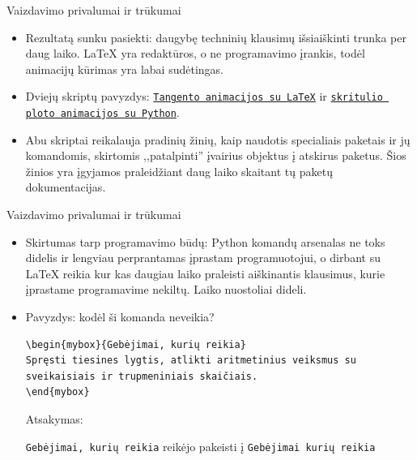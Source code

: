 \documentclass{beamer}
\begin{document}
\begin{frame}[fragile]{Vaizdavimo privalumai ir trūkumai}
\begin{itemize}
\item Rezultatą sunku pasiekti: daugybę techninių klausimų išsiaiškinti trunka per daug laiko. LaTeX yra redaktūros, o ne programavimo įrankis, todėl animacijų kūrimas yra labai sudėtingas. 

\item Dviejų skriptų pavyzdys: \href{https://pastebin.com/0qxQCsf7}{\texttt{Tangento animacijos su LaTeX}} ir \href{https://pastebin.com/YXVx8XT7}{\texttt{skritulio ploto animacijos su Python}}.

\item Abu skriptai reikalauja pradinių žinių, kaip naudotis specialiais paketais ir jų komandomis, skirtomis ,,patalpinti'' įvairius objektus į atskirus paketus. Šios žinios yra įgyjamos praleidžiant daug laiko skaitant tų paketų dokumentacijas.
\end{itemize}
\end{frame}

\begin{frame}[fragile]{Vaizdavimo privalumai ir trūkumai}
\begin{itemize}
\item Skirtumas tarp programavimo būdų: Python komandų arsenalas ne toks didelis ir lengviau perprantamas įprastam programuotojui, o dirbant su LaTeX reikia kur kas daugiau laiko praleisti aiškinantis klausimus, kurie įprastame programavime nekiltų. Laiko nuostoliai dideli.
\item Pavyzdys: kodėl ši komanda neveikia?
\begin{verbatim}
\begin{mybox}{Gebėjimai, kurių reikia}
Spręsti tiesines lygtis, atlikti aritmetinius veiksmus su sveikaisiais ir trupmeniniais skaičiais.
\end{mybox}
\end{verbatim}
Atsakymas: 

\texttt{Gebėjimai, kurių reikia} reikėjo pakeisti į \texttt{Gebėjimai\text{,} kurių reikia}
\end{itemize}
\end{frame}
\end{document}
